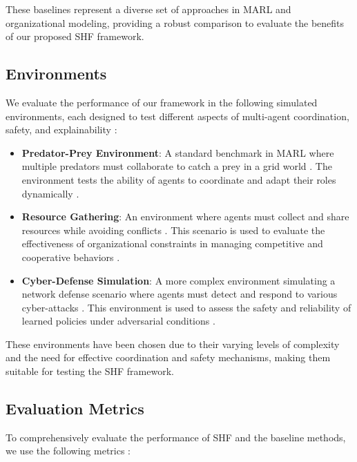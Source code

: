 \documentclass[sigconf,anonymous]{aamas}
\begin{document}

These baselines represent a diverse set of approaches in MARL and organizational modeling, providing a robust comparison to evaluate the benefits of our proposed SHF framework.

\subsection{Environments}
We evaluate the performance of our framework in the following simulated environments, each designed to test different aspects of multi-agent coordination, safety, and explainability \cite{foerster2016learning, soule2024}:

\begin{itemize}
    \item \textbf{Predator-Prey Environment}: A standard benchmark in MARL where multiple predators must collaborate to catch a prey in a grid world \cite{foerster2016learning}. The environment tests the ability of agents to coordinate and adapt their roles dynamically \cite{foerster2018counterfactual}.
    \item \textbf{Resource Gathering}: An environment where agents must collect and share resources while avoiding conflicts \cite{foerster2018counterfactual}. This scenario is used to evaluate the effectiveness of organizational constraints in managing competitive and cooperative behaviors \cite{hubner2010moise}.
    \item \textbf{Cyber-Defense Simulation}: A more complex environment simulating a network defense scenario where agents must detect and respond to various cyber-attacks \cite{bastani2018verifiable}. This environment is used to assess the safety and reliability of learned policies under adversarial conditions \cite{wei2019safe}.
\end{itemize}


These environments have been chosen due to their varying levels of complexity and the need for effective coordination and safety mechanisms, making them suitable for testing the SHF framework.

\subsection{Evaluation Metrics}
To comprehensively evaluate the performance of SHF and the baseline methods, we use the following metrics \cite{hubner2010moise, soule2024}:
\end{document}
